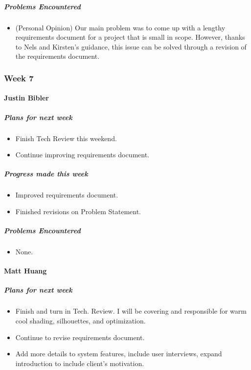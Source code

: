 {\subparagraph{Problems Encountered}
\begin{itemize}
  \item (Personal Opinion) Our main problem was to come up with a lengthy requirements document for a project that is small in scope. However, thanks to Nels and Kirsten's guidance, this issue can be solved through a revision of the requirements document.
\end{itemize}

}

\newpage

{
\subsubsection{Week 7}
\paragraph{Justin Bibler}
\subparagraph{Plans for next week}
\begin{itemize}
  \item Finish Tech Review this weekend.
  \item Continue improving requirements document.
\end{itemize}

\subparagraph{Progress made this week}
\begin{itemize}
  \item Improved requirements document.
  \item Finished revisions on Problem Statement.
\end{itemize}

\subparagraph{Problems Encountered}
\begin{itemize}
  \item None.
\end{itemize}

\vspace{3mm}

\paragraph{Matt Huang}
\subparagraph{Plans for next week}
\begin{itemize}
  \item Finish and turn in Tech. Review. I will be covering and responsible for warm cool shading, silhouettes, and optimization.
  \item Continue to revise requirements document.
  \item Add more details to system features, include user interviews, expand introduction to include client's motivation.
\end{itemize}

}
